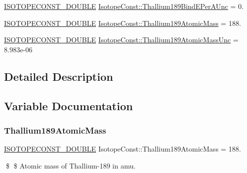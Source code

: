 \begin{DoxyCompactItemize}
\mbox{\hyperlink{group___isotope_const-_macros_ga8f45a7272ce02c0b4c65c44636ed719a}{I\+S\+O\+T\+O\+P\+E\+C\+O\+N\+S\+T\+\_\+\+D\+O\+U\+B\+LE}} \mbox{\hyperlink{group___isotope_const-_thallium-_tl189_gab29998259585d6ed270bf472d6a22826}{Isotope\+Const\+::\+Thallium189\+Bind\+E\+Per\+A\+Unc}} = 0.
\item 
\mbox{\hyperlink{group___isotope_const-_macros_ga8f45a7272ce02c0b4c65c44636ed719a}{I\+S\+O\+T\+O\+P\+E\+C\+O\+N\+S\+T\+\_\+\+D\+O\+U\+B\+LE}} \mbox{\hyperlink{group___isotope_const-_thallium-_tl189_ga137c6c687e9780ba57f22a4c68fab04c}{Isotope\+Const\+::\+Thallium189\+Atomic\+Mass}} = 188.
\item 
\mbox{\hyperlink{group___isotope_const-_macros_ga8f45a7272ce02c0b4c65c44636ed719a}{I\+S\+O\+T\+O\+P\+E\+C\+O\+N\+S\+T\+\_\+\+D\+O\+U\+B\+LE}} \mbox{\hyperlink{group___isotope_const-_thallium-_tl189_gab6400b51f84837860727f5c0fe6a4299}{Isotope\+Const\+::\+Thallium189\+Atomic\+Mass\+Unc}} = 8.\+983e-\/06
\end{DoxyCompactItemize}


\subsection{Detailed Description}


\subsection{Variable Documentation}
\mbox{\label{group___isotope_const-_thallium-_tl189_ga137c6c687e9780ba57f22a4c68fab04c}} 
\subsubsection{\texorpdfstring{Thallium189\+Atomic\+Mass}{Thallium189AtomicMass}}
{\footnotesize\ttfamily \mbox{\hyperlink{group___isotope_const-_macros_ga8f45a7272ce02c0b4c65c44636ed719a}{I\+S\+O\+T\+O\+P\+E\+C\+O\+N\+S\+T\+\_\+\+D\+O\+U\+B\+LE}} Isotope\+Const\+::\+Thallium189\+Atomic\+Mass = 188.}

\$ \$ Atomic mass of Thallium-\/189 in amu. \mbox{\label{group___isotope_const-_thallium-_tl189_gab6400b51f84837860727f5c0fe6a4299}} 
